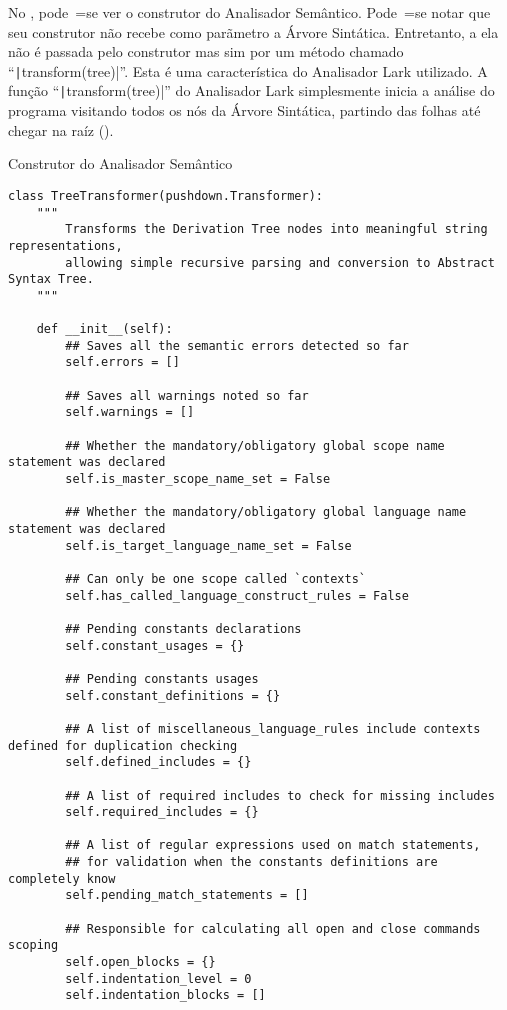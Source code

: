 No ,
pode~=se ver o construtor do Analisador Semântico.
Pode~=se notar que seu construtor não recebe como parãmetro a Árvore Sintática.
Entretanto,
a ela não é passada pelo construtor mas sim por um método chamado ``\texttt|transform(tree)|''.
Esta é uma característica do Analisador Lark utilizado.
A função ``\texttt|transform(tree)|'' do Analisador Lark simplesmente inicia a análise do programa visitando todos os nós da Árvore Sintática,
partindo das folhas até chegar na raíz ().
\begin{code}
\caption{Construtor do Analisador Semântico}
\label{code:semanticAnalizerConstructor}
\begin{verbatim}
class TreeTransformer(pushdown.Transformer):
    """
        Transforms the Derivation Tree nodes into meaningful string representations,
        allowing simple recursive parsing and conversion to Abstract Syntax Tree.
    """

    def __init__(self):
        ## Saves all the semantic errors detected so far
        self.errors = []

        ## Saves all warnings noted so far
        self.warnings = []

        ## Whether the mandatory/obligatory global scope name statement was declared
        self.is_master_scope_name_set = False

        ## Whether the mandatory/obligatory global language name statement was declared
        self.is_target_language_name_set = False

        ## Can only be one scope called `contexts`
        self.has_called_language_construct_rules = False

        ## Pending constants declarations
        self.constant_usages = {}

        ## Pending constants usages
        self.constant_definitions = {}

        ## A list of miscellaneous_language_rules include contexts defined for duplication checking
        self.defined_includes = {}

        ## A list of required includes to check for missing includes
        self.required_includes = {}

        ## A list of regular expressions used on match statements,
        ## for validation when the constants definitions are completely know
        self.pending_match_statements = []

        ## Responsible for calculating all open and close commands scoping
        self.open_blocks = {}
        self.indentation_level = 0
        self.indentation_blocks = []
\end{verbatim}
\end{code}

